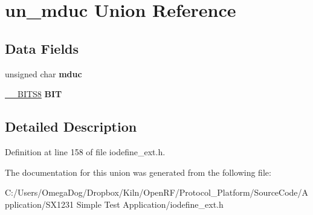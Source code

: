 \hypertarget{unionun__mduc}{\section{un\-\_\-mduc Union Reference}
\label{unionun__mduc}
}
\subsection*{Data Fields}
\begin{DoxyCompactItemize}
\item 
\hypertarget{unionun__mduc_ad908e70bb8bada4a406cf75b774b3380}{unsigned char {\bfseries mduc}}\label{unionun__mduc_ad908e70bb8bada4a406cf75b774b3380}

\item 
\hypertarget{unionun__mduc_aa0d1a8b63c5692132489af606c557d9a}{\hyperlink{struct_____b_i_t_s8}{\-\_\-\-\_\-\-B\-I\-T\-S8} {\bfseries B\-I\-T}}\label{unionun__mduc_aa0d1a8b63c5692132489af606c557d9a}

\end{DoxyCompactItemize}


\subsection{Detailed Description}


Definition at line 158 of file iodefine\-\_\-ext.\-h.



The documentation for this union was generated from the following file\-:\begin{DoxyCompactItemize}
\item 
C\-:/\-Users/\-Omega\-Dog/\-Dropbox/\-Kiln/\-Open\-R\-F/\-Protocol\-\_\-\-Platform/\-Source\-Code/\-Application/\-S\-X1231 Simple Test Application/iodefine\-\_\-ext.\-h\end{DoxyCompactItemize}

